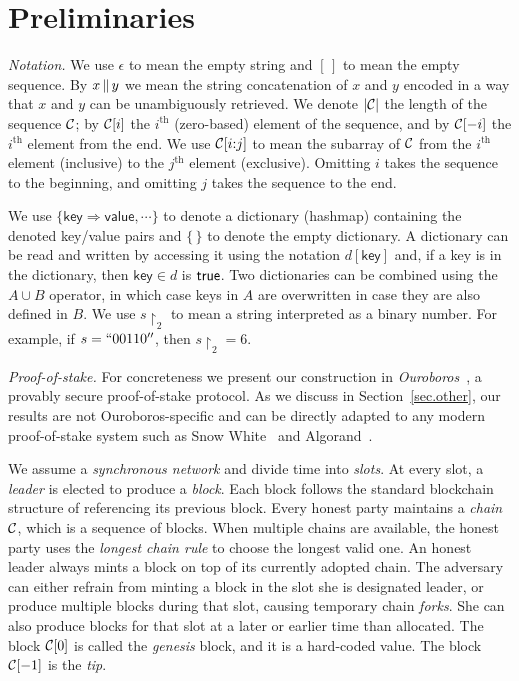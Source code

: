 \section{Preliminaries}

\noindent
\emph{Notation.}
We use $\epsilon$ to mean the empty string and $[\,]$ to mean the empty sequence.
By $x \,\|\, y$ we mean the string concatenation
of $x$ and $y$ encoded in a way that $x$ and $y$ can be unambiguously retrieved.
We denote $|\mathcal{C}|$ the length of the sequence $\mathcal{C}$; by $\mathcal{C}[i]$ the $i^\text{th}$ (zero-based)
element of the sequence, and by $\mathcal{C}[-i]$ the $i^\text{th}$ element from the end.
We use $\mathcal{C}[i{:}j]$ to mean the subarray of $\mathcal{C}$ from the $i^\text{th}$ element
(inclusive) to the $j^\text{th}$ element (exclusive). Omitting $i$ takes the sequence
to the beginning, and omitting $j$ takes the sequence to the end. 

We use $\{ \textsf{key} \Rightarrow \textsf{value}, \cdots \}$ to denote a dictionary (hashmap)
containing the denoted key/value pairs and $\{\,\}$ to denote the empty dictionary. A dictionary
can be read and written by accessing it using the notation $d[\textsf{key}]$ and, if a key is
in the dictionary, then $\textsf{key} \in d$ is $\mathsf{true}$. Two dictionaries
can be combined using the $A \cup B$ operator, in which case keys in $A$ are overwritten in
case they are also defined in $B$. We use $s\restriction_2$ to mean a string interpreted as
a binary number. For example, if $s = ``00110''$, then $s\restriction_2 = 6$.

\noindent
\emph{Proof-of-stake.}
For concreteness
we present our construction in
\emph{Ouroboros}~\cite{ouroboros}, a provably secure proof-of-stake protocol.
As we discuss in Section~\ref{sec.other},
our results
are not Ouroboros-specific and can be directly adapted to any modern proof-of-stake
system such as Snow White~\cite{snowwhite} and Algorand~\cite{algorand}.

We assume a \emph{synchronous network} and divide time into \emph{slots}. At every
slot, a \emph{leader} is elected to produce a \emph{block}. Each block follows the
standard blockchain structure of referencing its previous block. Every honest party
maintains a \emph{chain} $\mathcal{C}$, which is a sequence of blocks. When multiple chains
are
available, the honest party uses the \emph{longest chain rule} to choose the longest
valid one. An honest leader always mints a block on top of its currently adopted chain.
The adversary can either refrain from minting a block in the slot she is designated
leader, or produce multiple blocks during that slot, causing temporary chain \emph{forks}.
She can also produce blocks for that slot at a later or earlier time than allocated.
The block $\mathcal{C}[0]$
is called the \emph{genesis} block, and it is a hard-coded value. The block $\mathcal{C}[-1]$
is the \emph{tip}.

